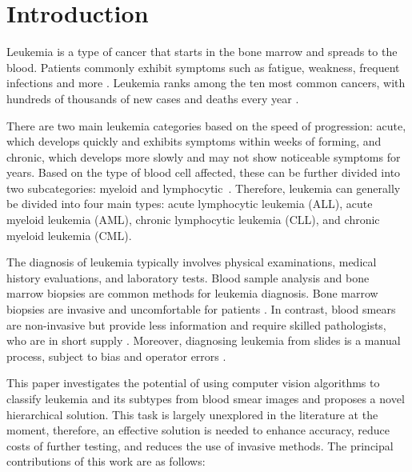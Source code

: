 \documentclass[runningheads]{llncs}
\begin{document}

\section{Introduction}

Leukemia is a type of cancer that starts in the bone marrow and spreads to the blood. Patients commonly exhibit symptoms such as fatigue, weakness, frequent infections and more \cite{mayo_clinic_leukemia}. Leukemia ranks among the ten most common cancers, with hundreds of thousands of new cases and deaths every year \cite{huang2022disease}.

There are two main leukemia categories based on the speed of progression: acute, which develops quickly and exhibits symptoms within weeks of forming, and chronic, which develops more slowly and may not show noticeable symptoms for years. Based on the type of blood cell affected, these can be further divided into two subcategories: myeloid and lymphocytic~\cite{mayo_clinic_leukemia}. Therefore, leukemia can generally be divided into four main types: acute lymphocytic leukemia (ALL), acute myeloid leukemia (AML), chronic lymphocytic leukemia (CLL), and chronic myeloid leukemia (CML).

The diagnosis of leukemia typically involves physical examinations, medical history evaluations, and laboratory tests. Blood sample analysis and bone marrow biopsies are common methods for leukemia diagnosis. Bone marrow biopsies are invasive and uncomfortable for patients \cite{biopsy}. In contrast, blood smears are non-invasive but provide less information and require skilled pathologists, who are in short supply \cite{bychkov_schubert_2023}. Moreover, diagnosing leukemia from slides is a manual process, subject to bias and operator errors \cite{mohapatra2010image}.

This paper investigates the potential of using computer vision algorithms to classify leukemia and its subtypes from blood smear images and proposes a novel hierarchical solution. This task is largely unexplored in the literature at the moment, therefore, an effective solution is needed to enhance accuracy, reduce costs of further testing, and reduces the use of invasive methods. The principal contributions of this work are as follows: 
\end{document}
